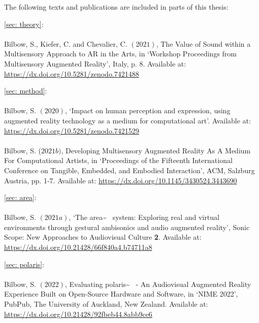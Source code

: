 \newpage \vspace*{2cm}

\noindent The following texts and publications are included in parts of this thesis:

\noindent\autoref{sec: theory}:  \\ \citep{bilbow2021} \\ Bilbow, S., Kiefer, C. and Chevalier, C. $(2021)$, The Value of Sound within a Multisensory Approach to AR in the Arts, in `Workshop Proceedings from Multisensory Augmented Reality', Italy, p. 8. Available at: \url{https://dx.doi.org/10.5281/zenodo.7421488}
    
\vspace*{0.75cm}
\noindent\autoref{sec: method}:  \\ \citep{bilbow2020,bilbow2021b} \\ Bilbow, S. $(2020)$, `Impact on human perception and expression, using augmented reality technology as a medium for computational art'. Available at: \url{https://dx.doi.org/10.5281/zenodo.7421529} \\ \\ Bilbow, S. ($2021b)$, Developing Multisensory Augmented Reality As A Medium For Computational Artists, in `Proceedings of the Fifteenth International Conference on Tangible, Embedded, and Embodied Interaction', ACM, Salzburg Austria, pp. 1-7. Available at: \url{https://dx.doi.org/10.1145/3430524.3443690}
    
\vspace*{0.75cm}
\noindent\autoref{sec: area}:  \\ \citep{bilbow2021a} \\ Bilbow, S. $(2021a)$, `The area\textasciitilde{}~ system: Exploring real and virtual environments through gestural ambisonics and audio augmented reality', Sonic Scope: New Approaches to Audiovisual Culture \textbf{2}. Available at: \url{https://dx.doi.org/10.21428/66f840a4.b74711a8}
    
\vspace*{0.75cm}
\noindent\autoref{sec: polaris}:  \\ \citep{bilbow2022} \\ Bilbow, S. $(2022)$, Evaluating polaris\textasciitilde{}~ - An Audiovisual Augmented Reality Experience Built on Open-Source Hardware and Software, in `NIME 2022', PubPub, The University of Auckland, New Zealand. Available at: \url{https://dx.doi.org/10.21428/92fbeb44.8abb9ce6}